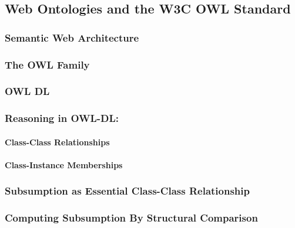 \documentclass[conference, a4paper]{styles/acmsiggraph}
\newcommand\subsubsubsection{\paragraph}
\begin{document}
    
    \subsection{Web Ontologies and the W3C OWL Standard}
    
        \subsubsection{Semantic Web Architecture}
        \subsubsection{The OWL Family}
        \subsubsection{OWL DL}
        \subsubsection{Reasoning in OWL-DL:}
            \subsubsubsection{Class-Class Relationships}
            \subsubsubsection{Class-Instance Memberships}
        \subsubsection{Subsumption as Essential Class-Class Relationship}
        \subsubsection{Computing Subsumption By Structural Comparison}
    
    
    
    
    
    
    
    
\end{document}
